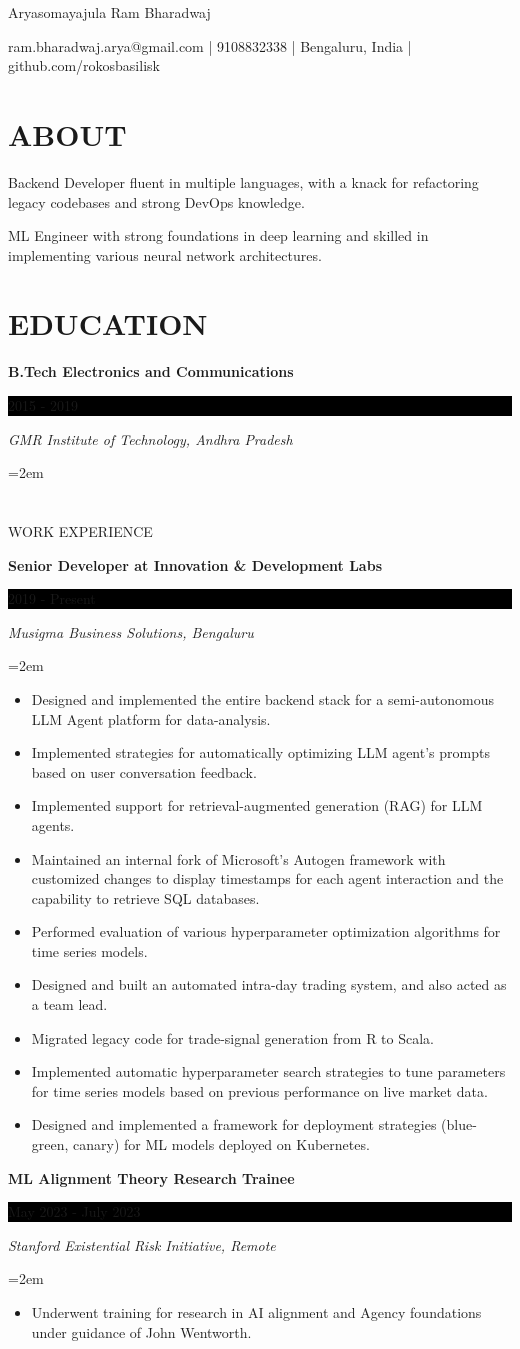 \documentclass[fontsize=11pt]{article}
\newcommand{\sepspace}{\vspace*{1em}}
\newcommand{\MyName}[1]{
    \Huge \usefont{OT1}{phv}{b}{n} \hfill #1
    \par \normalsize \normalfont}
\newcommand{\NewPart}[1]{\section*{\uppercase{#1}}}
\newcommand{\EducationEntry}[4]{
    \noindent \textbf{#1} \hfill
    \colorbox{Black}{\parbox{8.5em}{\hfill\color{White}#2}} \par
    \noindent \textit{#3} \par
    \noindent\hangindent=2em\hangafter=0 \small #4
    \normalsize \par}
\newcommand{\WorkEntry}[4]{
    \noindent \textbf{#1} \hfill
    \colorbox{Black}{\parbox{9em}{\hfill\color{White}#2}} \par
    \noindent \textit{#3} \par
    \noindent\hangindent=2em\hangafter=0 \small #4
    \normalsize \par}
\newcommand{\AboutEntry}[1]{
    \noindent #1 \par}
\begin{document}
\MyName{Aryasomayajula Ram Bharadwaj}
\bigskip

{\small \hfill ram.bharadwaj.arya@gmail.com | 9108832338 | Bengaluru, India | github.com/rokosbasilisk}

\NewPart{ABOUT}
\AboutEntry{Backend Developer fluent in multiple languages, with a knack for refactoring legacy codebases and strong DevOps knowledge.}
\AboutEntry{ML Engineer with strong foundations in deep learning and skilled in implementing various neural network architectures.}

\NewPart{EDUCATION}
\EducationEntry
{B.Tech Electronics and Communications}
{2015 - 2019}
{GMR Institute of Technology, Andhra Pradesh}

\NewPart{WORK EXPERIENCE}

\WorkEntry
{Senior Developer at Innovation \& Development Labs}
{2019 - Present}
{Musigma Business Solutions, Bengaluru}
{%
\begin{itemize}
    \item Designed and implemented the entire backend stack for a semi-autonomous LLM Agent platform for data-analysis.
    \item Implemented strategies for automatically optimizing LLM agent's prompts based on user conversation feedback.
    \item Implemented support for retrieval-augmented generation (RAG) for LLM agents.
    \item Maintained an internal fork of Microsoft's Autogen framework with customized changes to display timestamps for each agent interaction and the capability to retrieve SQL databases.
    \item Performed evaluation of various hyperparameter optimization algorithms for time series models.
    \item Designed and built an automated intra-day trading system, and also acted as a team lead.
    \item Migrated legacy code for trade-signal generation from R to Scala.
    \item Implemented automatic hyperparameter search strategies to tune parameters for time series models based on previous performance on live market data.
    \item Designed and implemented a framework for deployment strategies (blue-green, canary) for ML models deployed on Kubernetes.
\end{itemize}}

\sepspace
\WorkEntry
{ML Alignment Theory Research Trainee}
{May 2023 - July 2023}
{Stanford Existential Risk Initiative, Remote}
{%
\begin{itemize}
    \item Underwent training for research in AI alignment and Agency foundations under guidance of John Wentworth.
\end{itemize}}
\end{document}
